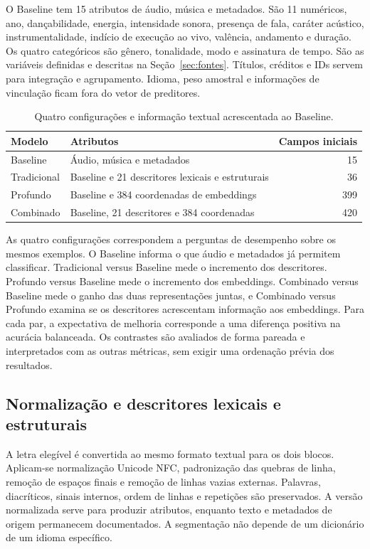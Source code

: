O Baseline tem 15 atributos de áudio, música e metadados. São 11 numéricos, ano, dançabilidade, energia, intensidade sonora, presença de fala, caráter acústico, instrumentalidade, indício de execução ao vivo, valência, andamento e duração. Os quatro categóricos são gênero, tonalidade, modo e assinatura de tempo. São as variáveis definidas e descritas na Seção~\ref{sec:fontes}. Títulos, créditos e IDs servem para integração e agrupamento. Idioma, peso amostral e informações de vinculação ficam fora do vetor de preditores.

\begin{table}[H]\centering\small
\caption{Quatro configurações e informação textual acrescentada ao Baseline.}\label{tab:blocos}
\begin{tabular}{@{}lP{.61\linewidth}r@{}}\toprule
Modelo & Atributos & Campos iniciais \\\midrule
Baseline & Áudio, música e metadados & 15 \\
Tradicional & Baseline e 21 descritores lexicais e estruturais & 36 \\
Profundo & Baseline e 384 coordenadas de embeddings & 399 \\
Combinado & Baseline, 21 descritores e 384 coordenadas & 420 \\\bottomrule
\end{tabular}
\end{table}

As quatro configurações correspondem a perguntas de desempenho sobre os mesmos exemplos. O Baseline informa o que áudio e metadados já permitem classificar. Tradicional versus Baseline mede o incremento dos descritores. Profundo versus Baseline mede o incremento dos embeddings. Combinado versus Baseline mede o ganho das duas representações juntas, e Combinado versus Profundo examina se os descritores acrescentam informação aos embeddings. Para cada par, a expectativa de melhoria corresponde a uma diferença positiva na acurácia balanceada. Os contrastes são avaliados de forma pareada e interpretados com as outras métricas, sem exigir uma ordenação prévia dos resultados.

\subsection{Normalização e descritores lexicais e estruturais}
A letra elegível é convertida ao mesmo formato textual para os dois blocos. Aplicam-se normalização Unicode NFC, padronização das quebras de linha, remoção de espaços finais e remoção de linhas vazias externas. Palavras, diacríticos, sinais internos, ordem de linhas e repetições são preservados. A versão normalizada serve para produzir atributos, enquanto texto e metadados de origem permanecem documentados. A segmentação não depende de um dicionário de um idioma específico.

